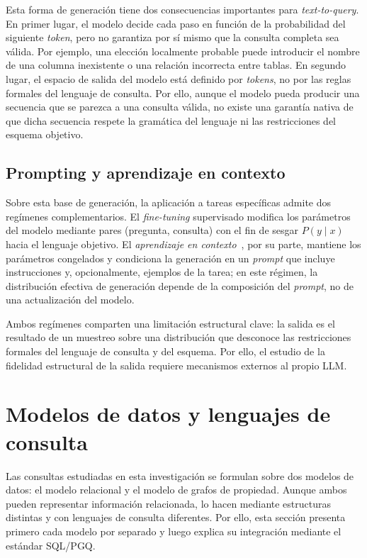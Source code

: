 Esta forma de generación tiene dos consecuencias importantes para \emph{text-to-query}. En primer lugar, el modelo decide cada paso en función de la probabilidad del siguiente \emph{token}, pero no garantiza por sí mismo que la consulta completa sea válida. Por ejemplo, una elección localmente probable puede introducir el nombre de una columna inexistente o una relación incorrecta entre tablas. En segundo lugar, el espacio de salida del modelo está definido por \emph{tokens}, no por las reglas formales del lenguaje de consulta. Por ello, aunque el modelo pueda producir una secuencia que se parezca a una consulta válida, no existe una garantía nativa de que dicha secuencia respete la gramática del lenguaje ni las restricciones del esquema objetivo.


\subsection{Prompting y aprendizaje en contexto}

Sobre esta base de generación, la aplicación a tareas específicas admite dos regímenes complementarios. El \emph{fine-tuning} supervisado modifica los parámetros del modelo mediante pares (pregunta, consulta) con el fin de sesgar $P(y \mid x)$ hacia el lenguaje objetivo. El \emph{aprendizaje en contexto}~\cite{Brown2020GPT3}, por su parte, mantiene los parámetros congelados y condiciona la generación en un \emph{prompt} que incluye instrucciones y, opcionalmente, ejemplos de la tarea; en este régimen, la distribución efectiva de generación depende de la composición del \emph{prompt}, no de una actualización del modelo.

Ambos regímenes comparten una limitación estructural clave: la salida es el resultado de un muestreo sobre una distribución que desconoce las restricciones formales del lenguaje de consulta y del esquema. Por ello, el estudio de la fidelidad estructural de la salida requiere mecanismos externos al propio \ac{LLM}.

\section{Modelos de datos y lenguajes de consulta}
\label{sec:modelos-datos}

Las consultas estudiadas en esta investigación se formulan sobre dos modelos de datos: el modelo relacional y el modelo de grafos de propiedad. Aunque ambos pueden representar información relacionada, lo hacen mediante estructuras distintas y con lenguajes de consulta diferentes. Por ello, esta sección presenta primero cada modelo por separado y luego explica su integración mediante el estándar \ac{SQL}/\ac{PGQ}.



